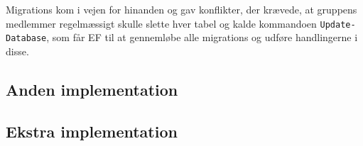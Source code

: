 Migrations kom i vejen for hinanden og gav konflikter, der krævede, at gruppens medlemmer regelmæssigt skulle slette hver tabel og kalde kommandoen \texttt{Update-Database}, som får \ac{EF} til at gennemløbe alle migrations og udføre handlingerne i disse. 

\subsection{Anden implementation}

\subsection{Ekstra implementation}


%
%
%
%


